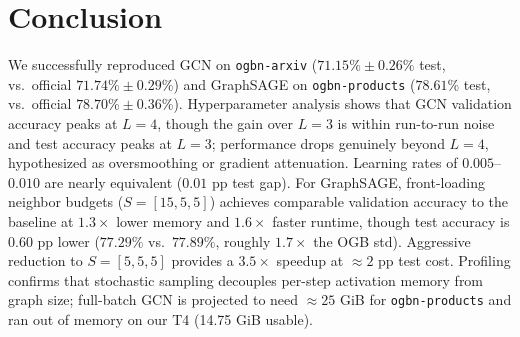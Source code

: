 \documentclass[10pt,twocolumn]{article}
\begin{document}
\section{Conclusion}
We successfully reproduced GCN on \texttt{ogbn-arxiv} ($71.15\%{\pm}0.26\%$
test, vs.\ official $71.74\%{\pm}0.29\%$) and GraphSAGE on \texttt{ogbn-products}
($78.61\%$ test, vs.\ official $78.70\%{\pm}0.36\%$). Hyperparameter analysis
shows that GCN validation accuracy peaks at $L=4$, though the gain over $L=3$
is within run-to-run noise and test accuracy peaks at $L=3$; performance drops
genuinely beyond $L=4$, hypothesized as oversmoothing or gradient attenuation.
Learning rates of $0.005$--$0.010$ are nearly equivalent ($0.01$ pp test gap).
For GraphSAGE, front-loading neighbor budgets ($S=[15,5,5]$) achieves
comparable validation accuracy to the baseline at $1.3{\times}$ lower memory
and $1.6{\times}$ faster runtime, though test accuracy is $0.60$ pp lower
($77.29\%$ vs.\ $77.89\%$, roughly $1.7{\times}$ the OGB std). Aggressive
reduction to $S=[5,5,5]$ provides a $3.5{\times}$ speedup at $\approx 2$ pp
test cost. Profiling confirms that stochastic sampling decouples per-step activation
memory from graph size; full-batch GCN is projected to need ${\approx}25$ GiB
for \texttt{ogbn-products} and ran out of memory on our T4 (14.75 GiB usable).
\end{document}
